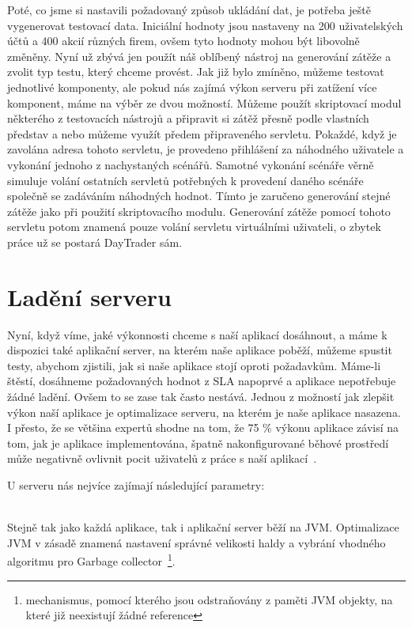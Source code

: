 \documentclass[122pt,oneside]{fithesis}
\begin{document}
Poté, co jsme si nastavili požadovaný způsob ukládání dat, je potřeba ještě vygenerovat testovací data. Iniciální hodnoty jsou nastaveny na 200 uživatelských účtů a 400 akcií různých firem, ovšem tyto hodnoty mohou být libovolně změněny. Nyní už zbývá jen použít náš oblíbený nástroj na generování zátěže a zvolit typ testu, který chceme provést. Jak již bylo zmíněno, můžeme testovat jednotlivé komponenty, ale pokud nás zajímá výkon serveru při zatížení více komponent, máme na výběr ze dvou možností. Můžeme použít skriptovací modul některého z testovacích nástrojů a připravit si zátěž přesně podle vlastních představ a nebo můžeme využít předem připraveného servletu. Pokaždé, když je zavolána adresa tohoto servletu, je provedeno přihlášení za náhodného uživatele a vykonání jednoho z nachystaných scénářů. Samotné vykonání scénáře věrně simuluje volání ostatních servletů potřebných k provedení daného scénáře společně se zadáváním náhodných hodnot. Tímto je zaručeno generování stejné zátěže jako při použití skriptovacího modulu. Generování zátěže pomocí tohoto servletu potom znamená pouze volání servletu virtuálními uživateli, o zbytek práce už se postará DayTrader sám.

\section{Ladění serveru}
Nyní, když víme, jaké výkonnosti chceme s naší aplikací dosáhnout, a máme k dispozici také aplikační server, na kterém naše aplikace poběží, můžeme spustit testy, abychom zjistili, jak si naše aplikace stojí oproti požadavkům. Máme-li štěstí, dosáhneme požadovaných hodnot z SLA napoprvé a aplikace nepotřebuje žádné ladění. Ovšem to se zase tak často nestává. Jednou z možností jak zlepšit výkon naší aplikace je optimalizace serveru, na kterém je naše aplikace nasazena. I přesto, že se většina expertů shodne na tom, že 75 \% výkonu aplikace závisí na tom, jak je aplikace implementována, špatně nakonfigurované běhové prostředí může negativně ovlivnit pocit uživatelů z práce s naší aplikací~\cite{performanceTuning}. 

U serveru nás nejvíce zajímají následující parametry:

\vspace{5 mm}
\\\indent Stejně tak jako každá aplikace, tak i aplikační server běží na JVM. Optimalizace JVM v zásadě znamená nastavení správné velikosti haldy a vybrání vhodného algoritmu pro Garbage collector~\footnote{mechanismus, pomocí kterého jsou odstraňovány z paměti JVM objekty, na které již neexistují žádné reference}.
\end{document}
